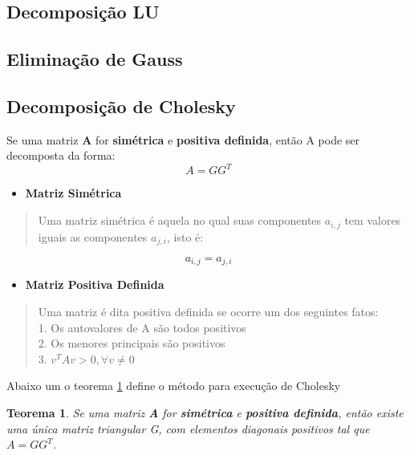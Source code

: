 \documentclass[
]{book}
\providecommand{\tightlist}{%
  \setlength{\itemsep}{0pt}\setlength{\parskip}{0pt}}
\newtheorem{theorem}{Teorema}
\begin{document}
\hypertarget{decomposiuxe7uxe3o-lu}{%
\subsection{Decomposição LU}\label{decomposiuxe7uxe3o-lu}}

\hypertarget{eliminauxe7uxe3o-de-gauss}{%
\subsection{Eliminação de Gauss}\label{eliminauxe7uxe3o-de-gauss}}

\hypertarget{decomposiuxe7uxe3o-de-cholesky}{%
\subsection{Decomposição de Cholesky}\label{decomposiuxe7uxe3o-de-cholesky}}

Se uma matriz \textbf{A} for \textbf{simétrica} e \textbf{positiva definida}, então A pode ser decomposta da forma:
\[A = GG^T\]

\begin{itemize}
\tightlist
\item
  \textbf{Matriz Simétrica}
\end{itemize}

\begin{quote}
Uma matriz simétrica é aquela no qual suas componentes \(a_{i,j}\) tem valores iguais as componentes \(a_{j,i}\), isto é:
\end{quote}

\[a_{i,j} = a_{j,i}\]

\begin{itemize}
\tightlist
\item
  \textbf{Matriz Positiva Definida}
\end{itemize}

\begin{quote}
Uma matriz é dita positiva definida se ocorre um dos seguintes fatos:\\
1. Os autovalores de A são todos positivos\\
2. Os menores principais são positivos\\
3. \(v^TAv > 0, \forall v \neq 0\)
\end{quote}

Abaixo um o teorema \ref{thm:cho} define o método para execução de Cholesky

\begin{theorem}
\protect\hypertarget{thm:cho}{}\label{thm:cho}Se uma matriz \textbf{A} for \textbf{simétrica} e \textbf{positiva definida}, então \emph{existe uma única} matriz triangular G, com elementos diagonais positivos tal que \(A = GG^T\).
\end{theorem}
\end{document}
